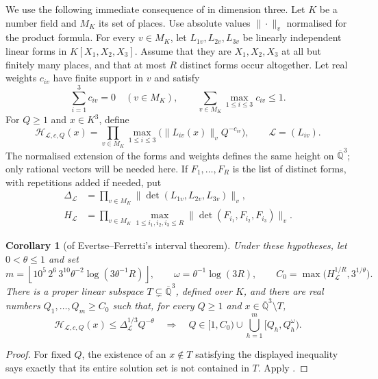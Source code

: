 \documentclass[11pt]{article}
\numberwithin{equation}{section}
\newtheorem{corollary}[theorem]{Corollary}
\theoremstyle{remark}
\newcommand{\Qbar}{\overline{\mathbb Q}}
\newcommand{\HH}{\mathcal H}
\begin{document}
We use the following immediate consequence of
\cite[Theorem~2.3]{EF13} in dimension three.
Let $K$ be a number field and $M_K$ its set of places.
Use absolute values $\|\cdot\|_v$ normalised for the product formula.
For every $v\in M_K$, let $L_{1v},L_{2v},L_{3v}$ be linearly independent
linear forms in $K[X_1,X_2,X_3]$. Assume that they are $X_1,X_2,X_3$
at all but finitely many places, and that at most $R$ distinct forms
occur altogether. Let real weights $c_{iv}$ have finite support in $v$
and satisfy
\begin{equation}\label{eq:weightconditions}
 \sum_{i=1}^3 c_{iv}=0\quad(v\in M_K),\qquad
 \sum_{v\in M_K}\max_{1\le i\le3}c_{iv}\le1.
\end{equation}
For $Q\ge1$ and $x\in K^3$, define
\[
 \HH_{\mathcal L,c,Q}(x)
 =\prod_{v\in M_K}\max_{1\le i\le3}
      \bigl(\|L_{iv}(x)\|_v Q^{-c_{iv}}\bigr),
 \qquad \mathcal L=(L_{iv}).
\]
The normalised extension of the forms and weights defines the same
height on $\Qbar^3$; only rational vectors will be needed here.
If $F_1,\ldots,F_R$ is the list of distinct forms, with repetitions
added if needed, put
\begin{align*}
 \Delta_{\mathcal L}
 &=\prod_{v\in M_K}\|\det(L_{1v},L_{2v},L_{3v})\|_v,\\
 H_{\mathcal L}
 &=\prod_{v\in M_K}
   \max_{1\le i_1,i_2,i_3\le R}
   \|\det(F_{i_1},F_{i_2},F_{i_3})\|_v.
\end{align*}

\begin{corollary}[of Evertse--Ferretti's interval theorem]\label{thm:intervals}
Under these hypotheses, let $0<\theta\le1$ and set
\[
 m=\left\lfloor10^5\,2^6\,3^{10}\theta^{-2}
                   \log(3\theta^{-1}R)\right\rfloor,\qquad
 \omega=\theta^{-1}\log(3R),\qquad
 C_0=\max\bigl(H_{\mathcal L}^{1/R},3^{1/\theta}\bigr).
\]
There is a proper linear subspace $T\subsetneq\Qbar^3$, defined over
$K$, and there are real numbers $Q_1,\ldots,Q_m\ge C_0$ such that,
for every $Q\ge1$ and $x\in\Qbar^3\setminus T$,
\[
 \HH_{\mathcal L,c,Q}(x)\le\Delta_{\mathcal L}^{1/3}Q^{-\theta}
 \quad\Longrightarrow\quad
 Q\in[1,C_0)\cup\bigcup_{h=1}^m[Q_h,Q_h^\omega).
\]
\end{corollary}
\begin{proof}
For fixed $Q$, the existence of an $x\notin T$ satisfying the displayed
inequality says exactly that its entire solution set is not contained
in $T$. Apply \cite[Theorem~2.3, equations (2.24)--(2.25)]{EF13}.
\end{proof}
\end{document}
